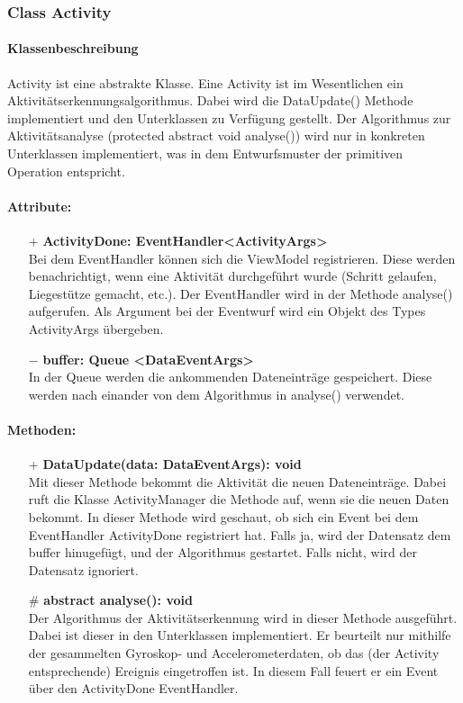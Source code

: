\documentclass[a4paper,12pt]{article}
\begin{document}
	
	\subsubsection{Class Activity}
	\paragraph{Klassenbeschreibung}
	Activity ist eine abstrakte Klasse. Eine Activity ist im Wesentlichen ein Aktivitätserkennungsalgorithmus. Dabei wird die DataUpdate() Methode implementiert und den Unterklassen zu Verfügung gestellt. Der Algorithmus zur Aktivitätsanalyse (protected abstract void analyse()) wird nur in konkreten Unterklassen implementiert, was in dem Entwurfsmuster der primitiven Operation entspricht.
	
	\paragraph{Attribute:}
	\begin{itemize}
		\item[+] \textbf{ActivityDone: EventHandler<ActivityArgs>}\\Bei dem EventHandler können sich die ViewModel registrieren. Diese werden benachrichtigt, wenn eine Aktivität durchgeführt wurde (Schritt gelaufen, Liegestütze gemacht, etc.). Der EventHandler wird in der Methode analyse() aufgerufen. Als Argument bei der Eventwurf wird ein Objekt des Types ActivityArgs übergeben.
		\item [$-$] \textbf{buffer: Queue <DataEventArgs>}\\In der Queue werden die ankommenden Dateneinträge gespeichert. Diese werden nach einander von dem Algorithmus in analyse() verwendet. 
	\end{itemize}
	\paragraph{Methoden:}
	\begin{itemize}
		\item[+] \textbf{DataUpdate(data: DataEventArgs): void}\\Mit dieser Methode bekommt die Aktivität die neuen Dateneinträge. Dabei ruft die Klasse ActivityManager die Methode auf, wenn sie die neuen Daten bekommt. In dieser Methode wird geschaut, ob sich ein Event bei dem EventHandler ActivityDone registriert hat. Falls ja, wird der Datensatz dem buffer hinugefügt, und der Algorithmus gestartet. Falls nicht, wird der Datensatz ignoriert.
		\item[\#] \textbf{abstract analyse(): void}\\Der Algorithmus der Aktivitätserkennung wird in dieser Methode ausgeführt. Dabei ist dieser in den Unterklassen implementiert. Er beurteilt nur mithilfe der gesammelten Gyroskop- und Accelerometerdaten, ob das (der Activity entsprechende) Ereignis eingetroffen ist. In diesem Fall feuert er ein Event über den ActivityDone EventHandler. 
	\end{itemize}
\end{document}
